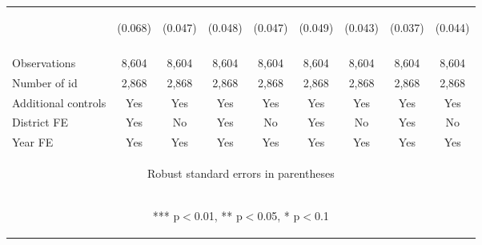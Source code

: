 \begin{center}
\begin{tabular}{lcccccccc}
 & \begin{footnotesize}(0.068)\end{footnotesize} & \begin{footnotesize}(0.047)\end{footnotesize} & \begin{footnotesize}(0.048)\end{footnotesize} & \begin{footnotesize}(0.047)\end{footnotesize} & \begin{footnotesize}(0.049)\end{footnotesize} & \begin{footnotesize}(0.043)\end{footnotesize} & \begin{footnotesize}(0.037)\end{footnotesize} & \begin{footnotesize}(0.044)\end{footnotesize} \\
\vspace{4pt} & \begin{footnotesize}\end{footnotesize} & \begin{footnotesize}\end{footnotesize} & \begin{footnotesize}\end{footnotesize} & \begin{footnotesize}\end{footnotesize} & \begin{footnotesize}\end{footnotesize} & \begin{footnotesize}\end{footnotesize} & \begin{footnotesize}\end{footnotesize} & \begin{footnotesize}\end{footnotesize} \\
Observations & 8,604 & 8,604 & 8,604 & 8,604 & 8,604 & 8,604 & 8,604 & 8,604 \\
Number of id & 2,868 & 2,868 & 2,868 & 2,868 & 2,868 & 2,868 & 2,868 & 2,868 \\
Additional controls & Yes & Yes & Yes & Yes & Yes & Yes & Yes & Yes \\
District FE & Yes & No & Yes & No & Yes & No & Yes & No \\
 Year FE & Yes & Yes & Yes & Yes & Yes & Yes & Yes & Yes \\ \hline
\multicolumn{9}{c}{\begin{footnotesize} Robust standard errors in parentheses\end{footnotesize}} \\
\multicolumn{9}{c}{\begin{footnotesize} *** p$<$0.01, ** p$<$0.05, * p$<$0.1\end{footnotesize}} \\
\end{tabular}
\end{center}
